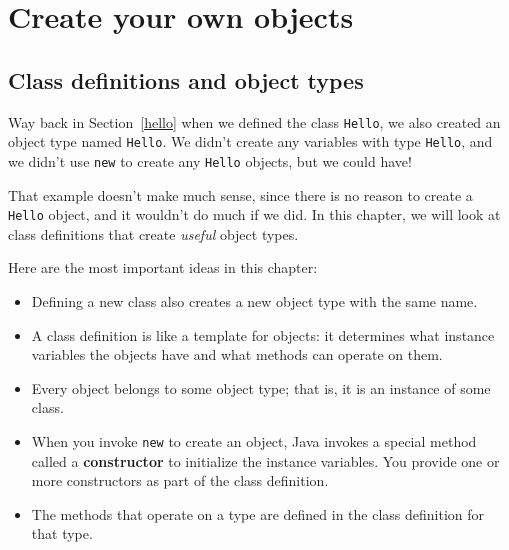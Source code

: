 \chapter{Create your own objects}
\label{chap09}

\section{Class definitions and object types}
\label{classes}

Way back in
Section~\ref{hello} when we defined the class {\tt Hello},
we also created an object type named {\tt Hello}.  We
didn't create any variables with type {\tt Hello}, and we
didn't use {\tt new} to create any {\tt Hello}
objects, but we could have!

That example doesn't make much sense, since there is no
reason to create a {\tt Hello} object, and it wouldn't do
much if we did.  In this chapter, we
will look at class definitions that create
{\em useful} object types.

Here are the most important ideas in this chapter:

\begin{itemize}

\item Defining a new class also creates a new object type
with the same name.

\item A class definition is like a template for objects:
it determines what instance variables the objects have and
what methods can operate on them.

\item Every object belongs to some object type; that is, it
is an instance of some class.

\item When you invoke {\tt new} to create an object, Java
invokes a special method called a {\bf constructor} to initialize the
instance variables.  You provide one or more constructors as part of
the class definition.

\item The methods that operate on a type are defined in the
class definition for that type.

\end{itemize}


